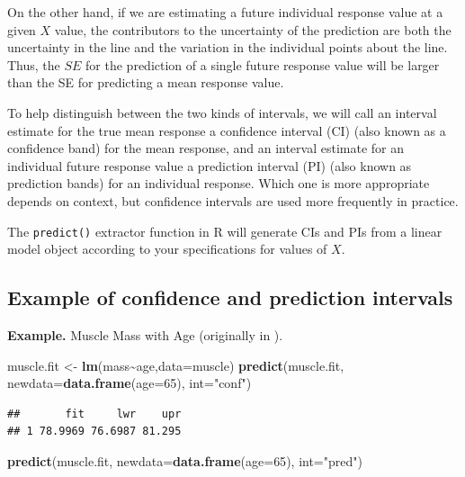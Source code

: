 \documentclass[
]{book}
\newenvironment{Shaded}{\begin{snugshade}}{\end{snugshade}}
\newcommand{\AttributeTok}[1]{\textcolor[rgb]{0.13,0.29,0.53}{#1}}
\newcommand{\DecValTok}[1]{\textcolor[rgb]{0.00,0.00,0.81}{#1}}
\newcommand{\FunctionTok}[1]{\textcolor[rgb]{0.13,0.29,0.53}{\textbf{#1}}}
\newcommand{\NormalTok}[1]{#1}
\newcommand{\OtherTok}[1]{\textcolor[rgb]{0.56,0.35,0.01}{#1}}
\newcommand{\SpecialCharTok}[1]{\textcolor[rgb]{0.81,0.36,0.00}{\textbf{#1}}}
\newcommand{\StringTok}[1]{\textcolor[rgb]{0.31,0.60,0.02}{#1}}
\begin{document}
On the other hand, if we are estimating a future individual response value at a given \(X\) value, the contributors to the uncertainty of the prediction are both the uncertainty in the line and the variation in the individual points about the line.
Thus, the \(SE\) for the prediction of a single future response value will be larger than the SE for predicting a mean response value.

To help distinguish between the two kinds of intervals, we will call an interval estimate for the true mean response a confidence interval (CI) (also known as a confidence band) for the mean response, and an interval estimate for an individual future response value a prediction interval (PI) (also known as prediction bands) for an individual response.
Which one is more appropriate depends on context, but confidence intervals are used more frequently in practice.

The \texttt{predict()} extractor function in R will generate CIs and PIs from a linear model object according to your specifications for values of \(X\).

\hypertarget{example-of-confidence-and-prediction-intervals}{%
\subsection{Example of confidence and prediction intervals}\label{example-of-confidence-and-prediction-intervals}}

\textbf{Example.} Muscle Mass with Age (originally in \citet{KutnerText}).

\begin{Shaded}
\begin{Highlighting}[]
\NormalTok{muscle.fit }\OtherTok{\textless{}{-}} \FunctionTok{lm}\NormalTok{(mass}\SpecialCharTok{\textasciitilde{}}\NormalTok{age,}\AttributeTok{data=}\NormalTok{muscle)}
\FunctionTok{predict}\NormalTok{(muscle.fit, }\AttributeTok{newdata=}\FunctionTok{data.frame}\NormalTok{(}\AttributeTok{age=}\DecValTok{65}\NormalTok{), }\AttributeTok{int=}\StringTok{"conf"}\NormalTok{)}
\end{Highlighting}
\end{Shaded}

\begin{verbatim}
##       fit     lwr    upr
## 1 78.9969 76.6987 81.295
\end{verbatim}

\begin{Shaded}
\begin{Highlighting}[]
\FunctionTok{predict}\NormalTok{(muscle.fit, }\AttributeTok{newdata=}\FunctionTok{data.frame}\NormalTok{(}\AttributeTok{age=}\DecValTok{65}\NormalTok{), }\AttributeTok{int=}\StringTok{"pred"}\NormalTok{)}
\end{Highlighting}
\end{Shaded}
\end{document}
